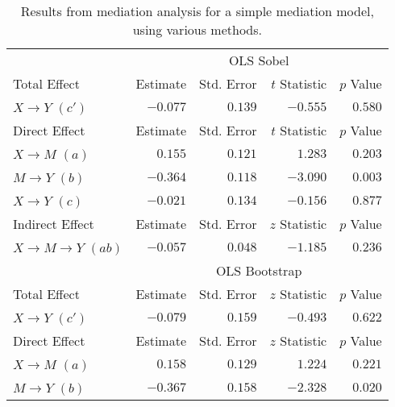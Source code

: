 \documentclass{article}\usepackage[]{graphicx}\usepackage[]{xcolor}
\begin{document}








\begin{table}[h!]
\caption{Results from mediation analysis for a simple mediation model, using various methods.}
\begin{center}
\begin{tabular}{lrrrr}
\hline\noalign{\smallskip}
 & \multicolumn{4}{c}{OLS Sobel} \\ 
\noalign{\smallskip}\cline{2- 5 }\noalign{\smallskip}
Total Effect & Estimate & Std. Error & $t$ Statistic & $p$ Value \\ 
\noalign{\smallskip}\hline\noalign{\smallskip}
$X \rightarrow Y$ $(c')$ & $-0.077$ & $ 0.139$ & $-0.555$ & $ 0.580$ \\ 
\noalign{\smallskip}\hline\noalign{\smallskip}
Direct Effect & Estimate & Std. Error & $t$ Statistic & $p$ Value \\ 
\noalign{\smallskip}\hline\noalign{\smallskip}
$X \rightarrow M$ $(a)$ & $ 0.155$ & $ 0.121$ & $ 1.283$ & $ 0.203$ \\ 
$M \rightarrow Y$ $(b)$ & $-0.364$ & $ 0.118$ & $-3.090$ & $ 0.003$ \\ 
$X \rightarrow Y$ $(c)$ & $-0.021$ & $ 0.134$ & $-0.156$ & $ 0.877$ \\ 
\noalign{\smallskip}\hline\noalign{\smallskip}
Indirect Effect & Estimate & Std. Error & $z$ Statistic & $p$ Value \\ 
\noalign{\smallskip}\hline\noalign{\smallskip}
$X \rightarrow M \rightarrow Y$ $(ab)$ & $-0.057$ & $ 0.048$ & $-1.185$ & $ 0.236$ \\ 
\noalign{\smallskip}\hline\noalign{\smallskip}
 & \multicolumn{4}{c}{OLS Bootstrap} \\ 
\noalign{\smallskip}\cline{2- 5 }\noalign{\smallskip}
Total Effect & Estimate & Std. Error & $z$ Statistic & $p$ Value \\ 
\noalign{\smallskip}\hline\noalign{\smallskip}
$X \rightarrow Y$ $(c')$ & $-0.079$ & $ 0.159$ & $-0.493$ & $ 0.622$ \\ 
\noalign{\smallskip}\hline\noalign{\smallskip}
Direct Effect & Estimate & Std. Error & $z$ Statistic & $p$ Value \\ 
\noalign{\smallskip}\hline\noalign{\smallskip}
$X \rightarrow M$ $(a)$ & $ 0.158$ & $ 0.129$ & $ 1.224$ & $ 0.221$ \\ 
$M \rightarrow Y$ $(b)$ & $-0.367$ & $ 0.158$ & $-2.328$ & $ 0.020$ \\ 

\end{tabular}
\end{center}
\end{table}
\end{document}
